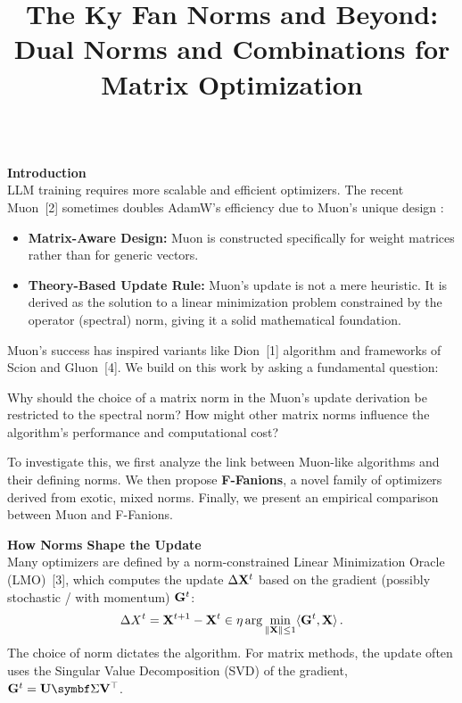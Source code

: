 \documentclass[fontsize=10pt]{beamer}
\title{The Ky Fan Norms and Beyond: Dual Norms and Combinations for Matrix Optimization}
\begin{document}
\begin{frame}[fragile]
\begin{columns}[T]
\hspace{0.02\textwidth}%
\begin{column}{0.30\textwidth}
\setlength{\parskip}{0.7em}
\setlength{\parindent}{0pt}
\Large

\textbf{\Huge\color{Zen}Introduction}\\[0.3em]

LLM training requires more scalable and efficient optimizers. The recent Muon~[2] sometimes doubles AdamW's efficiency due to Muon's unique design :
\begin{itemize}
  \item \textbf{\color{HazySummerEve}Matrix-Aware Design:} Muon is constructed specifically for weight matrices rather than for generic vectors.
  \item \textbf{\color{HazySummerEve}Theory-Based Update Rule:} Muon's update is not a mere heuristic. It is derived as the solution to a linear minimization problem constrained by the operator (spectral) norm, giving it a solid mathematical foundation.
\end{itemize}

Muon's success has inspired variants like Dion~[1] algorithm and frameworks of Scion and Gluon~[4]. We build on this work by asking a fundamental question:
\begin{attention}
Why should the choice of a matrix norm in the Muon’s update derivation be restricted to the spectral norm? How might other matrix norms influence the algorithm’s performance and computational cost?
\end{attention}
To investigate this, we first analyze the link between Muon-like algorithms and their defining norms. We then propose \textbf{\color{HazySummerEve}F-Fanions}, a novel family of optimizers derived from exotic, mixed norms. Finally, we present an empirical comparison between Muon and F-Fanions.

\vspace{0.5em}
\textbf{\Huge\color{Zen}How Norms Shape the Update}\\[0.3em]

Many optimizers are defined by a norm-constrained Linear Minimization Oracle (LMO)~[3], which computes the update $\Delta\mathbf{X}^t$ based on the gradient (possibly stochastic / with momentum) $\mathbf{G}^t$:
\begin{equation*}
    \Delta X^t = \mathbf{X}^{t+1} - \mathbf{X}^t \in \eta \arg\min_{\Vert{\mathbf{X}}\Vert \leq 1} \langle{\mathbf{G}^t},{\mathbf{X}}\rangle\,.
\end{equation*}
The choice of norm dictates the algorithm. For matrix methods, the update often uses the Singular Value Decomposition (SVD) of the gradient, $\mG^t = \mU \mSigma \mV^\top$.


\end{column}
\end{columns}
\end{frame}
\end{document}
